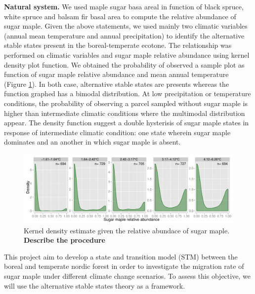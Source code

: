 \textbf{Natural system.}  We used maple sugar basa areal in function of black
spruce, white spruce and balsam fir basal area to compute the relative
abundance of sugar maple. Given the above statements, we used mainly two
climatic variables (annual mean temperature and annual precipitation) to
identify the alternative stable states present in the boreal-temperate
ecotone. The relationship was performed on climatic variables and sugar maple
relative abundance using kernel density plot function. We obtained the
probability of observed a sample plot as function of sugar maple relative
abundance and mean annual temperature (Figure \ref{fig1}). In both case,
alternative stable states are presents whereas the function graphed has a
bimodal distribution. At low precipitation or temperature conditions, the
probability of observing a parcel sampled without sugar maple is higher than
intermediate climatic conditions where the multimodal distribution appear. The
density function suggest a double hysterisis of sugar maple states in response
of intermediate climatic condition: one state wherein sugar maple dominates
and an another in which sugar maple is absent. \\


\begin{figure}[ht]
	\begin{center}
	\includegraphics[width=\textwidth]{fig/window_temp.pdf}
	\end{center}
	\caption{Kernel density estimate given the relative abundace of sugar maple. \textbf{Describe the procedure}}
	\label{fig1}
\end{figure}

This project aim to develop a state and transition model (STM) between the
boreal and temperate nordic forest in order to investigate the migration rate
of sugar maple under different climate change scenarios. To assess this
objective, we will use the alternative stable states theory as a framework.



